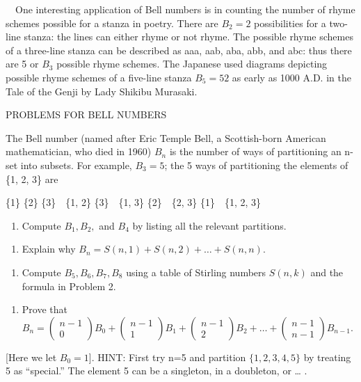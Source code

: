 \documentclass{article}
\begin{document}
\ \ One interesting application of Bell numbers is in counting the number of rhyme schemes possible for a stanza in
poetry. There are  $B_2=2$ possibilities for a two-line stanza: the lines can either rhyme or not rhyme. The possible
rhyme schemes of a three-line stanza can be described as aaa, aab, aba, abb, and abc: thus there are 5 or  $B_3$
possible rhyme schemes. The Japanese used diagrams depicting possible rhyme schemes of a five-line stanza  $B_5=52$ as
early as 1000 A.D. in the Tale of the Genji by Lady Shikibu Murasaki. 

PROBLEMS FOR BELL NUMBERS

The Bell number (named after Eric Temple Bell, a Scottish-born American mathematician, who died in 1960)  $B_n$ is the
number of ways of partitioning an n-set into subsets.  For example,  $B_3=5$; the 5 ways of partitioning the elements
of  \{1, 2, 3\} are

\{1\} \{2\} \{3\}\ \ \{1, 2\} \{3\}\ \ \{1, 3\} \{2\}\ \ \{2, 3\} \{1\}\ \ \{1, 2, 3\}

\begin{enumerate}
\item Compute  $B_1,B_2,$ and  $B_4$ by listing all the relevant partitions.
\end{enumerate}
\begin{enumerate}
\item Explain why  $B_n=S\left(n,1\right)+S\left(n,2\right)+{\dots}+S(n,n)$.
\end{enumerate}
\begin{enumerate}
\item Compute  $B_5,B_6,B_7,B_8$ using a table of Stirling numbers  $S(n,k)$ and the formula in Problem 2.
\end{enumerate}
\begin{enumerate}
\item Prove that 
$B_n=\left(\begin{matrix}n-1\\0\end{matrix}\right)B_0+\left(\begin{matrix}n-1\\1\end{matrix}\right)B_1+\left(\begin{matrix}n-1\\2\end{matrix}\right)B_2+{\dots}+\left(\begin{matrix}n-1\\n-1\end{matrix}\right)B_{n-1}$.
\end{enumerate}
[Here we let  $B_0=1$]. HINT: First try n=5 and partition  $\{1,2,3,4,5\}$ by treating 5 as “special.” The element 5 can
be a singleton, in a doubleton, or … .
\end{document}
